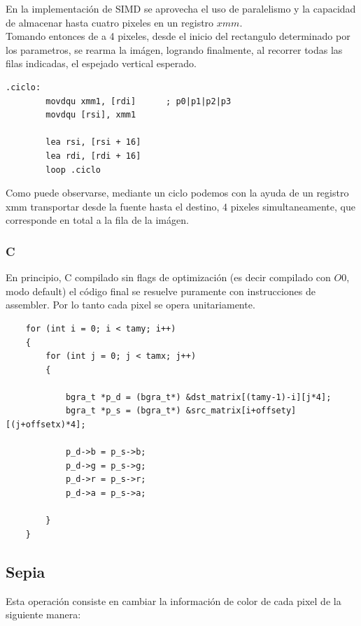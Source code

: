 En la implementación de SIMD se aprovecha el uso de paralelismo y la capacidad de almacenar hasta cuatro pixeles en un registro $xmm$.\\ 
Tomando entonces de a 4 pixeles, desde el inicio del rectangulo determinado por los parametros, se rearma la imágen, logrando finalmente, al recorrer todas las filas indicadas, el espejado vertical esperado.

\begin{codesnippet}
\begin{verbatim}
.ciclo:
        movdqu xmm1, [rdi]      ; p0|p1|p2|p3
        movdqu [rsi], xmm1
    
        lea rsi, [rsi + 16]
        lea rdi, [rdi + 16]
        loop .ciclo
\end{verbatim}
\end{codesnippet}

Como puede observarse, mediante un ciclo podemos con la ayuda de un registro xmm transportar desde la fuente hasta el destino, 4 pixeles simultaneamente, que corresponde en total a la fila de la imágen.

\subsubsection{C}

En principio, C compilado sin flags de optimización (es decir compilado con $O0$, modo default) el código final se resuelve puramente con instrucciones de assembler. Por lo tanto cada pixel se opera unitariamente. 

\begin{codesnippet}
\begin{verbatim}
    for (int i = 0; i < tamy; i++) 
    {
        for (int j = 0; j < tamx; j++) 
        {

            bgra_t *p_d = (bgra_t*) &dst_matrix[(tamy-1)-i][j*4];
            bgra_t *p_s = (bgra_t*) &src_matrix[i+offsety][(j+offsetx)*4];

            p_d->b = p_s->b;
            p_d->g = p_s->g;
            p_d->r = p_s->r;
            p_d->a = p_s->a;

        }
    }
\end{verbatim}
\end{codesnippet}

\subsection{Sepia}
Esta operación consiste en cambiar la información de color de cada pixel de la siguiente manera:

